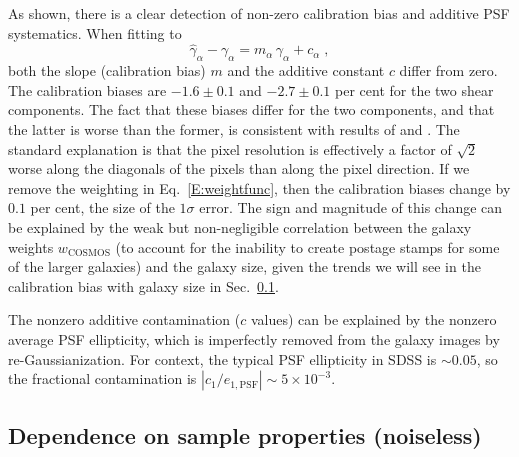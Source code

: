 \documentclass[twocolumn,useAMS,usenatbib]{mn2e}
\newcommand{\beq}{\begin{equation}}
\newcommand{\eeq}{\end{equation}}
\newcommand{\newtext}{}
\begin{document}
As shown, there is a clear detection
of non-zero calibration bias and additive PSF systematics.  When
fitting to 
\beq\label{E:calibbias}
\hat{\gamma}_\alpha - \gamma_\alpha = m_\alpha \, \gamma_\alpha + c_\alpha\;,
\eeq
both the slope (calibration bias) $m$ and the additive constant $c$
differ from zero. %
The calibration
biases are $-1.6 \pm 0.1$ and $-2.7\pm 0.1$ per cent for the two shear
components.  The fact that these biases differ for the two components,
and that the latter is worse than the former, is consistent with
results of \cite{2007PASP..119.1295H} and \cite{2007MNRAS.376...13M}.  The
standard explanation %
is that the pixel resolution is
effectively a factor of $\sqrt{2}$ worse along the diagonals of the
pixels than along the pixel direction.  \newtext{If we remove the
  weighting in Eq.~\eqref{E:weightfunc}, then the calibration biases
  change by $0.1$ per cent, the size of the $1\sigma$ error.  The
  sign and magnitude of this change can be explained by the weak but non-negligible correlation between the
  galaxy weights $w_\mathrm{COSMOS}$ (to account for the inability to
  create postage stamps for some of the larger galaxies) and the
  galaxy size, given the trends we will see in the calibration bias
  with galaxy size in Sec.~\ref{SSS:shearcalibtrends-nonoise}.}
  

The nonzero additive contamination ($c$ values) can be explained by the nonzero average PSF
ellipticity, which is imperfectly removed from the galaxy images by
re-Gaussianization.  For context, the typical PSF ellipticity in SDSS
is $\sim 0.05$, so the fractional contamination is 
$|c_1/e_{1,\mathrm{PSF}}| \sim 5\times 10^{-3}$.


\subsection{Dependence on sample properties (noiseless)}\label{SSS:shearcalibtrends-nonoise}
\end{document}
